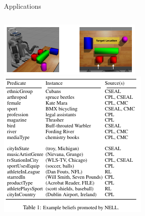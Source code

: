 \documentclass{beamer}
\begin{document}
\begin{frame}{Applications}
  \begin{columns}
    \begin{column}{0.5\textwidth}
      \centering
      \includegraphics[width=\textwidth,height=0.5\textheight,keepaspectratio]{application_robots.jpg}
      \\[-7pt]
      {\tiny \cite{DBLP:conf/iros/MoldovanR14}}
      \vfill
      \null
      \includegraphics[width=\textwidth,height=0.5\textheight,keepaspectratio]{application_nell.jpg}
      \\[-7pt]
      {\tiny \cite{DBLP:conf/aaai/CarlsonBKSHM10}}
    \end{column}
    \begin{column}{0.5\textwidth}
      \centering

\end{column}
\end{columns}
\end{frame}
\end{document}
